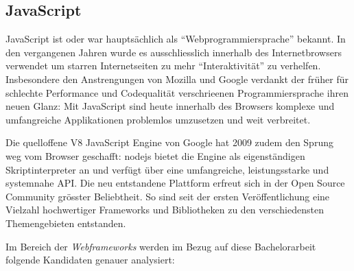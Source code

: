 \subsection{JavaScript}
\label{sec:technology-evaluation-javascript}

JavaScript ist oder war hauptsächlich als ``Webprogrammiersprache'' bekannt. In den vergangenen Jahren wurde es ausschliesslich innerhalb des Internetbrowsers verwendet um starren Internetseiten zu mehr ``Interaktivität'' zu verhelfen. Insbesondere den Anstrengungen von Mozilla \cite{SpiderMonkey} und Google \cite{V8JavaScript} verdankt der früher für schlechte Performance und Codequalität verschrieenen Programmiersprache ihren neuen Glanz: Mit JavaScript sind heute innerhalb des Browsers komplexe und umfangreiche Applikationen problemlos umzusetzen und weit verbreitet.

Die quelloffene V8 JavaScript Engine \cite{V8JavaScript} von Google hat 2009 zudem den Sprung weg vom Browser geschafft: \gls{nodejs} \cite{nodejs} bietet die Engine als eigenständigen Skriptinterpreter an und verfügt über eine umfangreiche, leistungsstarke und systemnahe API. Die neu entstandene Plattform erfreut sich in der Open Source Community grösster Beliebtheit. So sind seit der ersten Veröffentlichung eine Vielzahl hochwertiger Frameworks und Bibliotheken zu den verschiedensten Themengebieten entstanden.

Im Bereich der \emph{Webframeworks} werden im Bezug auf diese Bachelorarbeit folgende Kandidaten genauer analysiert:

